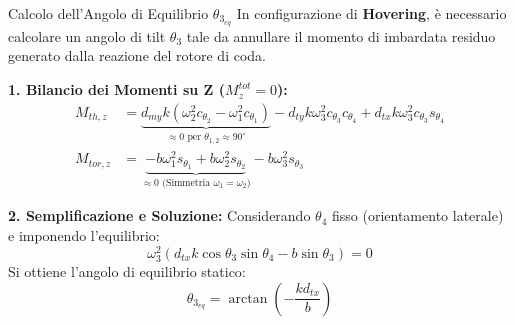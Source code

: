 \documentclass[aspectratio=169]{beamer} %
\begin{document}
\begin{frame}{Calcolo dell'Angolo di Equilibrio $\theta_{3_{eq}}$}
    \small
    In configurazione di \textbf{Hovering}, è necessario calcolare un angolo di tilt $\theta_3$ tale da annullare il momento di imbardata residuo generato dalla reazione del rotore di coda.

    \vspace{0.2cm}
    \textbf{1. Bilancio dei Momenti su Z ($M_{z}^{tot} = 0$):}
    \footnotesize
    \begin{align*}
        M_{th,z} &= \underbrace{d_{my} k (\omega_{2}^2 c_{\theta_2} - \omega_{1}^2 c_{\theta_1})}_{\approx 0 \text{ per } \theta_{1,2} \approx 90^\circ} 
                  - d_{ty} k \omega_{3}^2 c_{\theta_3} c_{\theta_4} 
                  + d_{tx} k \omega_{3}^2 c_{\theta_3} s_{\theta_4} \\
        M_{tor,z} &= \underbrace{-b \omega_{1}^2 s_{\theta_1} + b \omega_{2}^2 s_{\theta_2}}_{\approx 0 \text{ (Simmetria } \omega_1=\omega_2 \text{)}} 
                   - b \omega_{3}^2 s_{\theta_3}
    \end{align*}
    
    \vspace{0.1cm}
    \normalsize
    \textbf{2. Semplificazione e Soluzione:}
    Considerando $\theta_4$ fisso (orientamento laterale) e imponendo l'equilibrio:
    \begin{equation*}
        \omega_3^2 \left( d_{tx} k \cos\theta_3 \sin\theta_4 - b \sin\theta_3 \right) = 0
    \end{equation*}
    Si ottiene l'angolo di equilibrio statico:  
    \begin{equation}
        \boxed{\theta_{3_{eq}} = \arctan\left( -\frac{k d_{tx}}{b}\right)}
    \end{equation}
    
\end{frame}
\end{document}
